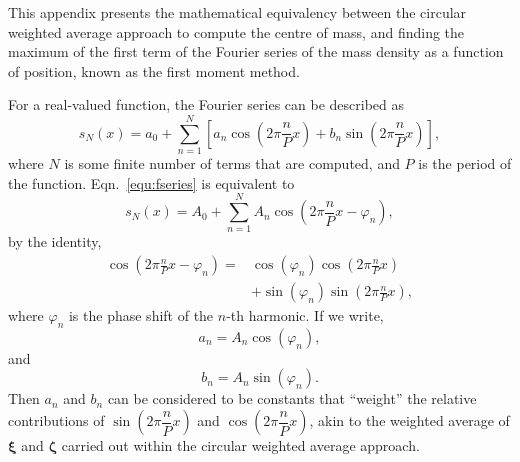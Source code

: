 \documentclass[reprint,superscriptaddress,nobibnotes,amsmath,amssymb,aip]{revtex4-2}
\begin{document}
This appendix presents the mathematical equivalency between the circular weighted average approach to compute the centre of mass, and finding the maximum of the first term of the Fourier series of the mass density as a function of position, known as the first moment method.\cite{teague_robust_2018}

For a real-valued function, the Fourier series can be described as 
%
\begin{equation}
    s_N(x) = a_0 + \sum_{n=1}^{N} \left[ a_n \cos \left( 2\pi \frac{n}{P} x \right) + b_n \sin \left( 2\pi \frac{n}{P} x \right) \right],
    \label{equ:fseries}
\end{equation}
%
where $N$ is some finite number of terms that are computed, and $P$ is the period of the function. 
Eqn.~\ref{equ:fseries} is equivalent to
%
\begin{equation}
    s_N(x) = A_0 + \sum_{n=1}^{N} A_n \cos\left(2\pi \frac{n}{P}x - \varphi_n\right),
\end{equation}
%
by the identity, 
%
\begin{equation}
    \begin{aligned}
        \cos \left( 2\pi \frac{n}{P} x - \varphi_n \right) = & \cos(\varphi_n) \cos \left( 2\pi \frac{n}{P} x \right)  \\ 
        & + \sin(\varphi_n) \sin \left( 2\pi \frac{n}{P} x \right),
    \end{aligned}
\end{equation}
where $\varphi_n$ is the phase shift of the $n$-th harmonic. 
If we write, 
%
\begin{equation}
    a_n = A_n \cos(\varphi_n),
\end{equation}
%
and
%
\begin{equation}
    b_n = A_n \sin(\varphi_n).
\end{equation}
%
Then $a_n$ and $b_n$ can be considered to be constants that ``weight'' the relative contributions of $\sin \left( 2\pi \dfrac{n}{P} x \right)$ and $\cos \left( 2\pi \dfrac{n}{P} x \right)$, akin to the weighted average of $\bm{\xi}$ and $\bm{\zeta}$ carried out within the circular weighted average approach.
\end{document}
